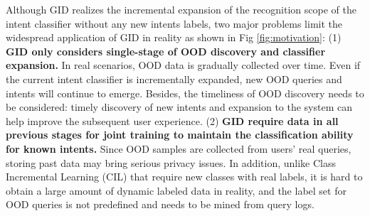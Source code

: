 \documentclass[11pt]{article}
\begin{document}
Although GID realizes the incremental expansion of the recognition scope of the intent classifier without any new intents labels, two major problems limit the widespread application of GID in reality as shown in Fig \ref{fig:motivation}: (1) \textbf{GID only considers single-stage of OOD discovery and classifier expansion.} %
In real scenarios, OOD data is gradually collected over time. Even if the current intent classifier is incrementally expanded, new OOD queries and intents will continue to emerge. Besides, the timeliness of OOD discovery needs to be considered: timely discovery of new intents and expansion to the system can help improve the subsequent user experience.
(2) \textbf{GID require data in all previous stages for joint training to maintain the classification ability for known intents.} Since OOD samples are collected from users' real queries, storing past data may bring serious privacy issues. In addition, unlike Class Incremental Learning (CIL) that require new classes with real labels, it is hard to obtain a large amount of dynamic labeled data in reality, and the label set for OOD queries is not predefined and needs to be mined from query logs.

\end{document}
